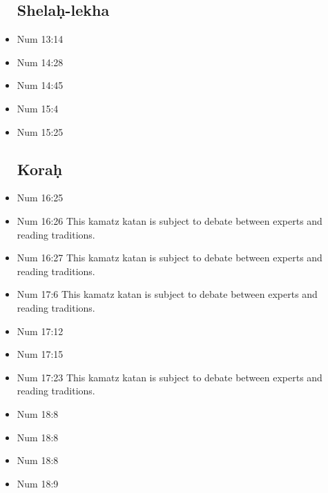 \documentclass[14pt]{book}
\begin{document}
\begin{multicols}{2}
\begin{itemize}
\subsection{Shela\d{h}-lekha}

\item Num 13:14

\item Num 14:28

\item Num 14:45

\item Num 15:4

\item Num 15:25

\subsection{Kora\d{h}}

\item Num 16:25

\item Num 16:26 This kamatz katan is subject to debate between experts and reading traditions.

\item Num 16:27 This kamatz katan is subject to debate between experts and reading traditions.

\item Num 17:6 This kamatz katan is subject to debate between experts and reading traditions.

\item Num 17:12

\item Num 17:15

\item Num 17:23 This kamatz katan is subject to debate between experts and reading traditions.

\item Num 18:8

\item Num 18:8

\item Num 18:8

\item Num 18:9


\end{itemize}
\end{multicols}
\end{document}
